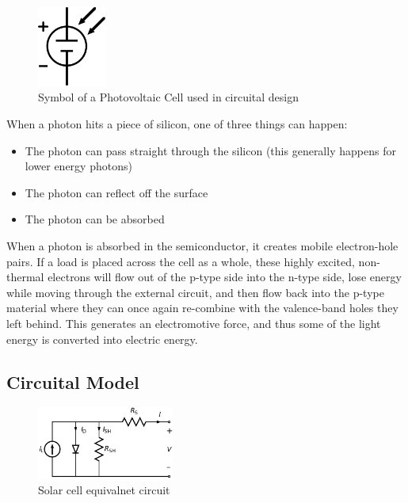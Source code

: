 \documentclass[11pt]{article} %
\begin{document}
\begin{figure}
	\centering
	\includegraphics[width=0.2\textwidth]{img/Photovoltaic_cell.png}
	\caption{Symbol of a Photovoltaic Cell used in circuital design}
	\vspace{-10pt}
\end{figure}

When a photon hits a piece of silicon, one of three things can happen:  
\begin{itemize}
	\item The photon can pass straight through the silicon (this generally happens for lower energy photons) 
	\item The photon can reflect off the surface 
	\item The photon can be absorbed 
\end{itemize}

When a photon is absorbed in the semiconductor, it creates mobile electron-hole pairs. If a load is placed across the cell as a whole, these highly excited, non-thermal electrons will flow out of the p-type side into the n-type side, lose energy while moving through the external circuit, and then flow back into the p-type material where they can once again re-combine with the valence-band holes they left behind. This generates an electromotive force, and thus some of the light energy is converted into electric energy.

\subsection {Circuital Model}

\begin{figure}
	\centering
	\includegraphics[width=0.4\textwidth]{img/601px-Solar_cell_equivalent_circuit.png}
	\caption{Solar cell equivalnet circuit}
	\vspace{10pt}
\end{figure}
\end{document}
